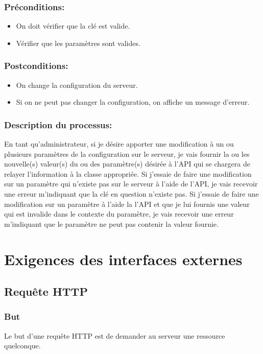 \documentclass{scrreprt}
\begin{document}
\subsubsection{Préconditions:}
\begin{itemize}
    \item On doit vérifier que la clé est valide.
    \item Vérifier que les paramètres sont valides.
\end{itemize} 
\subsubsection{Postconditions:}
\begin{itemize}
    \item On change la configuration du serveur.
    \item Si on ne peut pas changer la configuration, on affiche un message d'erreur.
\end{itemize} 
\subsubsection{Description du processus:}En tant qu'administrateur, si je désire apporter une modification à un ou plusieurs
paramètres de la configuration sur le serveur, je vais fournir la ou les nouvelle(s) valeur(s)
du ou des paramètre(s) désirée à l'API qui se chargera de relayer l'information à la classe appropriée.
Si j'essaie de faire une modification sur un paramètre qui n'existe pas sur le
serveur à l'aide de l'API, je vais recevoir une erreur m'indiquant que la clé en
question n'existe pas.
Si j'essaie de faire une modification sur un paramètre à l'aide la l'API et que
je lui fournis une valeur qui est invalide dans le contexte du paramètre, je
vais recevoir une erreur m'indiquant que le paramètre ne peut pas contenir
la valeur fournie.

\section{Exigences des interfaces externes}
\subsection{Requête HTTP}
\subsubsection{But} Le but d'une requête HTTP est de demander au serveur une ressource quelconque.
\end{document}
